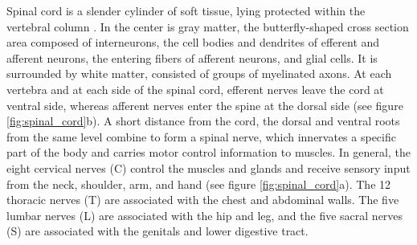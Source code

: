 Spinal cord is a slender cylinder of soft tissue, lying protected within the vertebral column \citep{Widmaier2014}. In the center is gray matter, the butterfly-shaped cross section area composed of interneurons, the cell bodies and dendrites of efferent and afferent neurons, the entering fibers of afferent neurons, and glial cells. It is surrounded by white matter, consisted of groups of myelinated axons. At each vertebra and at each side of the spinal cord, efferent nerves leave the cord at ventral side, whereas afferent nerves enter the spine at the dorsal side (see figure \ref{fig:spinal_cord}b). A short distance from the cord, the dorsal and ventral roots from the same level combine to form a spinal nerve, which innervates a specific part of the body and carries motor control information to muscles. In general, the eight cervical nerves (C) control the muscles and glands and receive sensory input from the neck, shoulder, arm, and hand (see figure \ref{fig:spinal_cord}a). The 12 thoracic nerves (T) are associated with the chest and abdominal walls. The five lumbar nerves (L) are associated with the hip and leg, and the five sacral nerves (S) are associated with the genitals and lower digestive tract.

